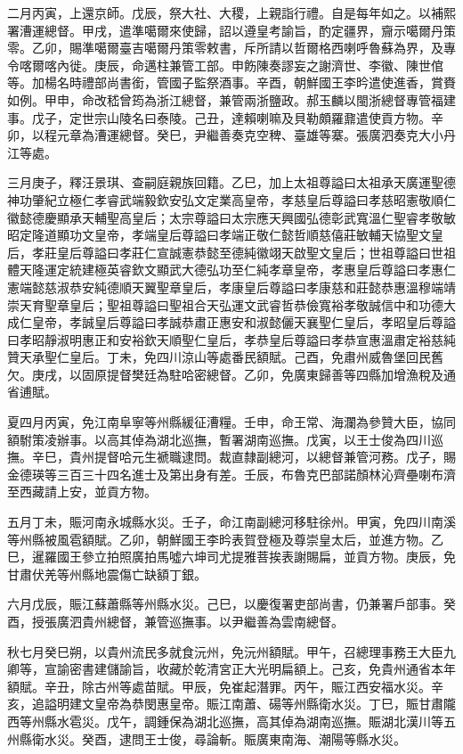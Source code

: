 \begin{pinyinscope}
二月丙寅，上還京師。戊辰，祭大社、大稷，上親詣行禮。自是每年如之。以補熙署漕運總督。甲戌，遣準噶爾來使歸，詔以遵皇考諭旨，酌定疆界，齎示噶爾丹策零。乙卯，賜準噶爾臺吉噶爾丹策零敕書，斥所請以哲爾格西喇呼魯蘇為界，及專令喀爾喀內徙。庚辰，命邁柱兼管工部。申飭陳奏謬妄之謝濟世、李徽、陳世倌等。加楊名時禮部尚書銜，管國子監祭酒事。辛酉，朝鮮國王李昑遣使進香，賞賚如例。甲申，命改嵇曾筠為浙江總督，兼管兩浙鹽政。郝玉麟以閩浙總督專管福建事。戊子，定世宗山陵名曰泰陵。己丑，達賴喇嘛及貝勒頗羅鼐遣使貢方物。辛卯，以程元章為漕運總督。癸巳，尹繼善奏克空稗、臺雄等寨。張廣泗奏克大小丹江等處。

三月庚子，釋汪景琪、查嗣庭親族回籍。乙巳，加上太祖尊謚曰太祖承天廣運聖德神功肇紀立極仁孝睿武端毅欽安弘文定業高皇帝，孝慈皇后尊謚曰孝慈昭憲敬順仁徽懿德慶顯承天輔聖高皇后；太宗尊謚曰太宗應天興國弘德彰武寬溫仁聖睿孝敬敏昭定隆道顯功文皇帝，孝端皇后尊謚曰孝端正敬仁懿哲順慈僖莊敏輔天協聖文皇后，孝莊皇后尊謚曰孝莊仁宣誠憲恭懿至德純徽翊天啟聖文皇后；世祖尊謚曰世祖體天隆運定統建極英睿欽文顯武大德弘功至仁純孝章皇帝，孝惠皇后尊謚曰孝惠仁憲端懿慈淑恭安純德順天翼聖章皇后，孝康皇后尊謚曰孝康慈和莊懿恭惠溫穆端靖崇天育聖章皇后；聖祖尊謚曰聖祖合天弘運文武睿哲恭儉寬裕孝敬誠信中和功德大成仁皇帝，孝誠皇后尊謚曰孝誠恭肅正惠安和淑懿儷天襄聖仁皇后，孝昭皇后尊謚曰孝昭靜淑明惠正和安裕欽天順聖仁皇后，孝恭皇后尊謚曰孝恭宣惠溫肅定裕慈純贊天承聖仁皇后。丁未，免四川涼山等處番民額賦。己酉，免肅州威魯堡回民舊欠。庚戌，以固原提督樊廷為駐哈密總督。乙卯，免廣東歸善等四縣加增漁稅及通省逋賦。

夏四月丙寅，免江南阜寧等州縣緩征漕糧。壬申，命王常、海瀾為參贊大臣，協同額駙策凌辦事。以高其倬為湖北巡撫，暫署湖南巡撫。戊寅，以王士俊為四川巡撫。辛巳，貴州提督哈元生褫職逮問。裁直隸副總河，以總督兼管河務。戊子，賜金德瑛等三百三十四名進士及第出身有差。壬辰，布魯克巴部諾顏林沁齊壘喇布濟至西藏請上安，並貢方物。

五月丁未，賑河南永城縣水災。壬子，命江南副總河移駐徐州。甲寅，免四川南溪等州縣被風雹額賦。乙卯，朝鮮國王李昑表賀登極及尊崇皇太后，並進方物。乙巳，暹羅國王參立拍照廣拍馬噓六坤司尤提雅菩挨表謝賜扁，並貢方物。庚辰，免甘肅伏羌等州縣地震傷亡缺額丁銀。

六月戊辰，賑江蘇蕭縣等州縣水災。己巳，以慶復署吏部尚書，仍兼署戶部事。癸酉，授張廣泗貴州總督，兼管巡撫事。以尹繼善為雲南總督。

秋七月癸巳朔，以貴州流民多就食沅州，免沅州額賦。甲午，召總理事務王大臣九卿等，宣諭密書建儲諭旨，收藏於乾清宮正大光明扁額上。己亥，免貴州通省本年額賦。辛丑，除古州等處苗賦。甲辰，免崔起潛罪。丙午，賑江西安福水災。辛亥，追謚明建文皇帝為恭閔惠皇帝。賑江南蕭、碭等州縣衛水災。丁巳，賑甘肅隴西等州縣水雹災。戊午，調鍾保為湖北巡撫，高其倬為湖南巡撫。賑湖北漢川等五州縣衛水災。癸酉，逮問王士俊，尋論斬。賑廣東南海、潮陽等縣水災。


\end{pinyinscope}
